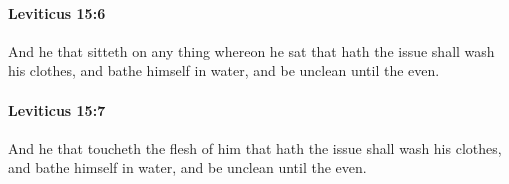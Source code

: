		\paragraph{Leviticus 15:6} %
			\label{LEVITICUS-15-6}

			And he that sitteth on any thing whereon he sat that hath the issue shall wash his clothes, and bathe himself in water, and be unclean until the even.


		\paragraph{Leviticus 15:7} %
			\label{LEVITICUS-15-7}

			And he that toucheth the flesh of him that hath the issue shall wash his clothes, and bathe himself in water, and be unclean until the even.


